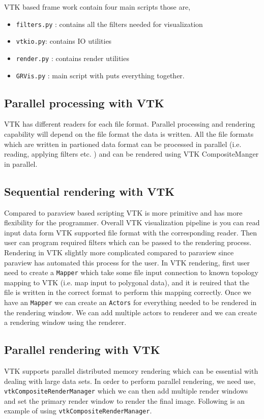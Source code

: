VTK based frame work contain four main scripts those are, 
\begin{itemize}
	\item \texttt{filters.py} : contains all the filters needed for visualization
	\item \texttt{vtkio.py}: contains IO utilities
	\item \texttt{render.py} : contains render utilities
	\item \texttt{GRVis.py} : main script with puts everything together. 
\end{itemize}

\subsection{Parallel processing with VTK}
VTK has different readers for each file format. Parallel processing and rendering capability will depend on the file format the data is written. All the file formats which are written in partioned data format can be processed in parallel (i.e. reading, applying filters etc. )
and can be rendered using VTK CompositeManger in parallel. 

\subsection{Sequential rendering with VTK}
Compared to paraview based scripting VTK is more primitive and has more flexibility for the programmer. Overall VTK visualization pipeline is you can read input data form VTK supported file format with the corresponding reader. Then user can program required filters which can be passed to the rendering process. Rendering in VTK slightly more complicated compared to paraview since paraview has automated this process for the user. In VTK rendering, first user need to create a \texttt{Mapper} which take some file input connection to known topology mapping to VTK (i.e. map input to polygonal data), and it is reuired that the file is written in the correct format to perform this mapping correctly. Once we have an \texttt{Mapper} we can create an \texttt{Actors} for everything needed to be rendered in the rendering window. We can add multiple actors to renderer and we can create a rendering window using the renderer. 

\subsection{Parallel rendering with VTK}
VTK supports parallel distributed memory rendering which can be essential with dealing with large data sets. In order to perform parallel rendering, we need use, \texttt{vtkCompositeRenderManager} which we can then add multiple render windows and set the primary render window to render the final image. Following is an example of using \texttt{vtkCompositeRenderManager}.


